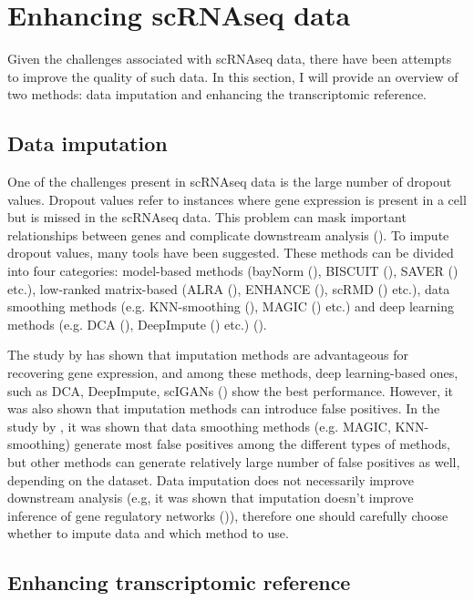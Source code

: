 \section{Enhancing scRNAseq data}

Given the challenges associated with scRNAseq data, there have been attempts to improve the quality of such data.
In this section, I will provide an overview of two methods: data imputation and enhancing the transcriptomic reference.

\subsection{Data imputation}

One of the challenges present in scRNAseq data is the large number of dropout values.
Dropout values refer to instances where gene expression is present in a cell but is missed in the scRNAseq data.
This problem can mask important relationships between genes and complicate downstream analysis (\cite{Wang2022}).
To impute dropout values, many tools have been suggested.
These methods can be divided into four categories:
model-based methods (bayNorm (\cite{Tang2019}), BISCUIT (\cite{Azizi2017}), SAVER (\cite{Huang2018}) etc.),
low-ranked matrix-based (ALRA (\cite{Linderman2022}), ENHANCE (\cite{Wagner2019}), scRMD (\cite{Chen2020}) etc.),
data smoothing methods (e.g. KNN-smoothing (\cite{Wagner2017}), MAGIC (\cite{Dijk2018}) etc.) and
deep learning methods (e.g. DCA (\cite{Eraslan2019}), DeepImpute (\cite{Arisdakessian2019}) etc.) (\cite{Wang2022}).

The study by \textcite{Dai2022} has shown that imputation methods are advantageous for recovering gene expression,
and among these methods, deep learning-based ones,
such as DCA, DeepImpute, scIGANs (\cite{Xu2020}) show the best performance.
However, it was also shown that imputation methods can introduce false positives.
In the study by \textcite{Andrews2019}, it was shown that data smoothing methods (e.g. MAGIC, KNN-smoothing)
generate most false positives among the different types of methods,
but other methods can generate relatively large number of false positives as well, depending on the dataset.
Data imputation does not necessarily improve downstream analysis
(e.g, it was shown that imputation doesn't improve inference of gene regulatory networks (\cite{McCalla2023})),
therefore one should carefully choose whether to impute data and which method to use.

\subsection{Enhancing transcriptomic reference}

